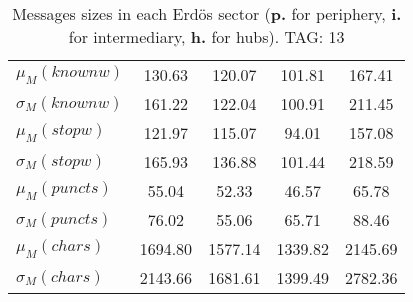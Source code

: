\begin{table}[h!]
\begin{center}
\begin{tabular}{| l || c | c | c | c |}
$\mu_M(knownw)$ & 130.63  & 120.07  & 101.81  & 167.41 \\
$\sigma_M(knownw)$ & 161.22  & 122.04  & 100.91  & 211.45 \\\hline
$\mu_M(stopw)$ & 121.97  & 115.07  & 94.01  & 157.08 \\
$\sigma_M(stopw)$ & 165.93  & 136.88  & 101.44  & 218.59 \\\hline
$\mu_M(puncts)$ & 55.04  & 52.33  & 46.57  & 65.78 \\
$\sigma_M(puncts)$ & 76.02  & 55.06  & 65.71  & 88.46 \\\hline
$\mu_M(chars)$ & 1694.80  & 1577.14  & 1339.82  & 2145.69 \\
$\sigma_M(chars)$ & 2143.66  & 1681.61  & 1399.49  & 2782.36 \\\hline
\end{tabular}
\caption{Messages sizes in each Erd\"os sector ({{\bf p.}} for periphery, {{\bf i.}} for intermediary, {{\bf h.}} for hubs). TAG: 13}
\end{center}
\end{table}